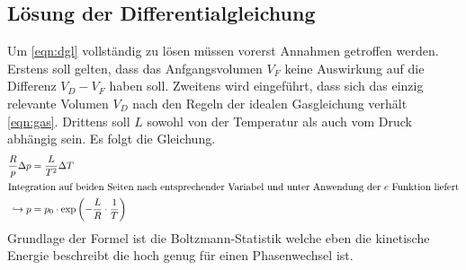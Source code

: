 \subsection{Lösung der Differentialgleichung}
Um \eqref{eqn:dgl} vollständig zu lösen müssen vorerst Annahmen getroffen werden. 
Erstens soll gelten, dass das Anfgangsvolumen $V_F$ keine Auswirkung auf die Differenz $V_D - V_F$ haben soll. Zweitens wird eingeführt, dass 
sich das einzig relevante Volumen $V_D$ nach den Regeln der idealen Gasgleichung verhält \eqref{eqn:gas}. Drittens soll $L$ sowohl von der Temperatur
als auch vom Druck abhängig sein.
Es folgt die Gleichung.
\begin{align}
\label{eqn:wichtig}
    \frac{R}{p} \Delta p &= \frac{L}{T^2} \Delta T \\
    \intertext{Integration auf beiden Seiten nach entsprechender Variabel und unter Anwendung der $e$ Funktion liefert}
    \hookrightarrow p &= p_0 \cdot \text{exp} \left(-\frac{L}{R} \cdot \frac{1}{T}\right)
\end{align}
Grundlage der Formel ist die Boltzmann-Statistik welche eben die kinetische Energie beschreibt die hoch genug für einen Phasenwechsel ist. 
